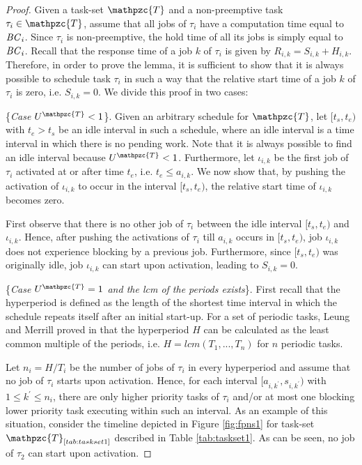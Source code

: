 \documentclass[conference,compsoc]{IEEEtran}
\newcommand{\bc}    {\mbox{\it BC}}
\begin{document}
\begin{proof}
	Given a task-set $\mathpzc{T}$ and a non-preemptive task $\tau_i \in \mathpzc{T}$, assume that all jobs of $\tau_i$ have a computation time equal to $\bc_i$. Since $\tau_i$ is non-preemptive, the hold time of all its jobs is simply equal to $\bc_i$. Recall that the response time of a job $k$ of $\tau_i$ is given by $R_{i,k}=S_{i,k}+H_{i,k}$. Therefore, in order to prove the lemma, it is sufficient to show that it is always possible to schedule task $\tau_i$ in such a way that the relative start time of a job $k$ of $\tau_i$ is zero, i.e. $S_{i,k}=0$. We divide this proof in two cases:
	
	\{\textit{Case $U^{\mathpzc{T}} < 1$}\}. Given an arbitrary schedule for $\mathpzc{T}$, let $[t_s,t_e)$ with $t_e > t_s$ be an idle interval in such a schedule, where an idle interval is a time interval in which there is no pending work. Note that it is always possible to find an idle interval because $U^{\mathpzc{T}} < 1$. Furthermore, let $\iota_{i,k}$  be the first job of $\tau_i$ activated at or after time $t_e$, i.e. $t_e \leq a_{i,k}$. We now show that, by pushing the activation of $\iota_{i,k}$ to occur in the interval $[t_s,t_e)$, the relative start time of $\iota_{i,k}$ becomes zero.
	
	First observe that there is no other job of $\tau_i$ between the idle interval $[t_s,t_e)$ and $\iota_{i,k}$. Hence, after pushing the activations of $\tau_i$ till $a_{i,k}$ occurs in $[t_s,t_e)$, job $\iota_{i,k}$ does not experience blocking by a previous job. Furthermore, since $[t_s,t_e)$ was originally idle, job $\iota_{i,k}$ can start upon activation, leading to $S_{i,k} = 0$.
	
	\{\textit{Case $U^{\mathpzc{T}} = 1$ and the lcm of the periods exists}\}. 
	First recall that the hyperperiod is defined as the length of the shortest time interval in which the schedule repeats itself after an initial start-up. For a set of periodic tasks, Leung and Merrill proved in \cite{LM80} that the hyperperiod $H$ can be calculated as the least common multiple of the periods, i.e. $H=lcm(T_1,...,T_n)$ for $n$ periodic tasks. 
	
	Let $n_i = H/T_i$ be the number of jobs of $\tau_i$ in every hyperperiod and assume that no job of $\tau_i$ starts upon activation. Hence, for each interval $[a_{i,k^{\prime}},s_{i,k^{\prime}})$ with $1 \leq k^{\prime} \leq n_i$, there are only higher priority tasks of $\tau_i$ and/or at most one blocking lower priority task executing within such an interval. As an example of this situation, consider the timeline depicted in Figure \ref{fig:fpns1} for task-set $\mathpzc{T}_{\ref{tab:taskset1}}$ described in Table \ref{tab:taskset1}. As can be seen, no job of $\tau_2$ can start upon activation.
	

\end{proof}
\end{document}
